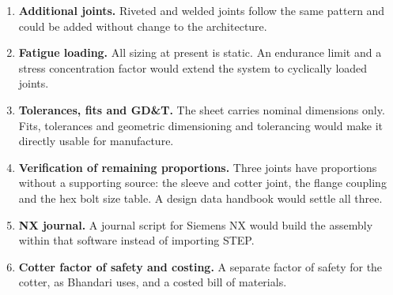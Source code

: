 \begin{enumerate}
  \item \textbf{Additional joints.} Riveted and welded joints follow the same pattern and could be added without change to the architecture.
  \item \textbf{Fatigue loading.} All sizing at present is static. An endurance limit and a stress concentration factor would extend the system to cyclically loaded joints.
  \item \textbf{Tolerances, fits and GD\&T.} The sheet carries nominal dimensions only. Fits, tolerances and geometric dimensioning and tolerancing would make it directly usable for manufacture.
  \item \textbf{Verification of remaining proportions.} Three joints have proportions without a supporting source: the sleeve and cotter joint, the flange coupling and the hex bolt size table. A design data handbook would settle all three.
  \item \textbf{NX journal.} A journal script for Siemens NX would build the assembly within that software instead of importing STEP.
  \item \textbf{Cotter factor of safety and costing.} A separate factor of safety for the cotter, as Bhandari uses, and a costed bill of materials.
\end{enumerate}
